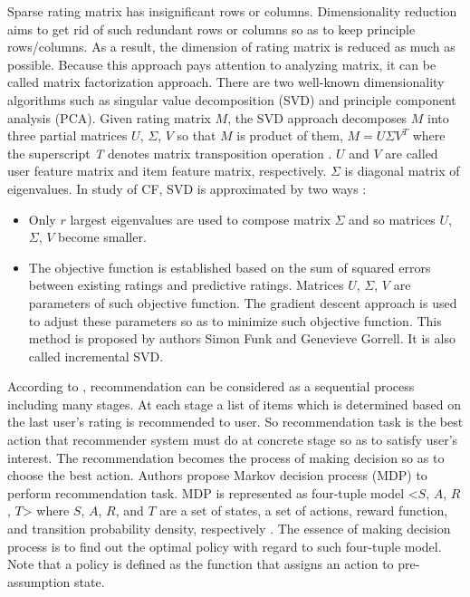 \documentclass{article}
\begin{document}
Sparse rating matrix has insignificant rows or columns. Dimensionality reduction aims to get rid of such redundant rows or columns so as to keep principle rows/columns. As a result, the dimension of rating matrix is reduced as much as possible. Because this approach pays attention to analyzing matrix, it can be called matrix factorization approach. There are two well-known dimensionality algorithms such as singular value decomposition (SVD) and principle component analysis (PCA). Given rating matrix $M$, the SVD approach decomposes $M$ into three partial matrices $U$, $\Sigma$, $V$ so that $M$ is product of them, $M = U \Sigma V^T$ where the superscript \textit{T} denotes matrix transposition operation \cite[p.~1]{percy:svd}. $U$ and $V$ are called user feature matrix and item feature matrix, respectively. $\Sigma$ is diagonal matrix of eigenvalues. In study of CF, SVD is approximated by two ways \cite[pp.~2-5]{percy:svd}:
\begin{itemize}
\item Only $r$ largest eigenvalues are used to compose matrix $\Sigma$ and so matrices $U$, $\Sigma$, $V$ become smaller.
\item The objective function is established based on the sum of squared errors between existing ratings and predictive ratings. Matrices $U$, $\Sigma$, $V$ are parameters of such objective function. The gradient descent approach is used to adjust these parameters so as to minimize such objective function. This method is proposed by authors Simon Funk and Genevieve Gorrell. It is also called incremental SVD.
\end{itemize}

According to \cite[p.~1266]{shani:mdp}, recommendation can be considered as a sequential process including many stages. At each stage a list of items which is determined based on the last user's rating is recommended to user. So recommendation task is the best action that recommender system must do at concrete stage so as to satisfy user's interest. The recommendation becomes the process of making decision so as to choose the best action. Authors \cite[p.~1266]{shani:mdp} propose Markov decision process (MDP) to perform recommendation task. MDP is represented as four-tuple model <$S$, $A$, $R$, $T$> where $S$, $A$, $R$, and $T$ are a set of states, a set of actions, reward function, and transition probability density, respectively \cite[pp.~1270-1271]{shani:mdp}. The essence of making decision process is to find out the optimal policy with regard to such four-tuple model. Note that a policy is defined as the function that assigns an action to pre-assumption state.
\end{document}
